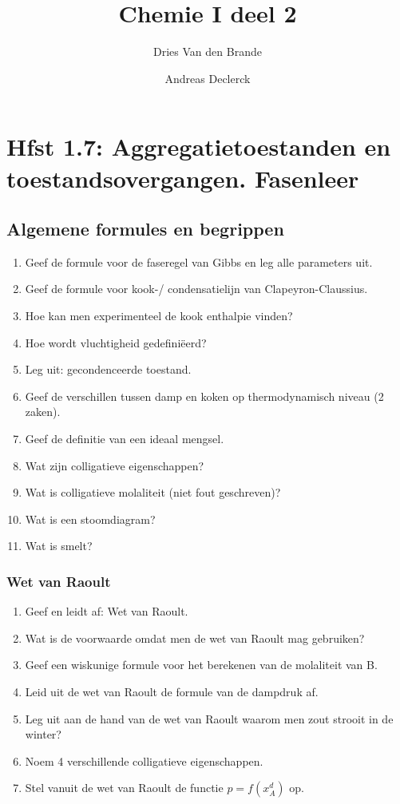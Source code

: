 \documentclass[a4paper,12pt]{article}
\begin{document}
    \title{Chemie I deel 2}
    \author{Dries Van den Brande \and Andreas Declerck}

    \maketitle
    \section{Hfst 1.7: Aggregatietoestanden en toestandsovergangen. Fasenleer}

    \subsection{Algemene formules en begrippen}
    \begin{enumerate}
        \item Geef de formule voor de faseregel van Gibbs en leg alle parameters uit.
        \item Geef de formule voor kook-/ condensatielijn van Clapeyron-Claussius.
        \item Hoe kan men experimenteel de kook enthalpie vinden?
        \item Hoe wordt vluchtigheid gedefini\"eerd?
        \item Leg uit: gecondenceerde toestand.
        \item Geef de verschillen tussen damp en koken op thermodynamisch niveau (2 zaken).
        \item Geef de definitie van een ideaal mengsel.
        \item Wat zijn colligatieve eigenschappen?
        \item Wat is colligatieve molaliteit (niet fout geschreven)?
        \item Wat is een stoomdiagram?
        \item Wat is smelt?
    \end{enumerate}

    \subsubsection{Wet van Raoult}
    \begin{enumerate}
        \item Geef en leidt af: Wet van Raoult.
        \item Wat is de voorwaarde omdat men de wet van Raoult mag gebruiken?
        \item Geef een wiskunige formule voor het berekenen van de molaliteit van B.
        \item Leid uit de wet van Raoult de formule van de dampdruk af.
        \item Leg uit aan de hand van de wet van Raoult waarom men zout strooit in de winter?
        \item Noem 4 verschillende colligatieve eigenschappen.
        \item Stel vanuit de wet van Raoult de functie $ p = f(x_A^d) $ op.
    \end{enumerate}
\end{document}
